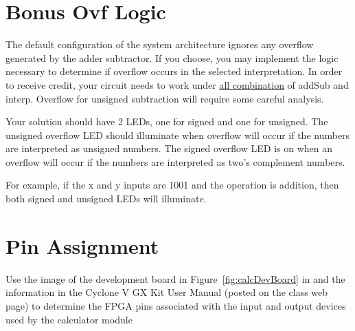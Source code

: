 \section{Bonus Ovf Logic}

The default configuration of the system architecture ignores any
overflow generated by the adder subtractor. If you choose, you may
implement the logic necessary to determine if overflow occurs in the
selected interpretation. In order to receive credit, your circuit needs
to work under \uline{all combination} of addSub and interp. Overflow for
unsigned subtraction will require some careful analysis.

Your solution should have 2 LEDs, one for signed and one for unsigned.
The unsigned overflow LED should illuminate when overflow will occur if
the numbers are interpreted as unsigned numbers. The signed overflow LED
is on when an overflow will occur if the numbers are interpreted as
two's complement numbers.

For example, if the x and y inputs are 1001 and the operation is
addition, then both signed and unsigned LEDs will illuminate.

\hypertarget{pin-assignment}{%
\section{Pin Assignment}\label{pin-assignment}}

Use the image of the development board in Figure~\ref{fig:calcDevBoard} in and the
information in the Cyclone V GX Kit User Manual (posted on the class web
page) to determine the FPGA pins associated with the input and output
devices used by the calculator module

